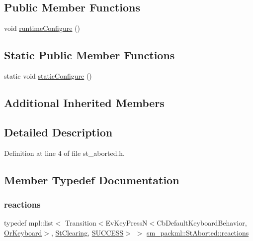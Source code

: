\subsection*{Public Member Functions}
\begin{DoxyCompactItemize}
\item 
void \hyperlink{structsm__packml_1_1StAborted_ae24353777c69ff47bf657ba4314fb0c3}{runtime\+Configure} ()
\end{DoxyCompactItemize}
\subsection*{Static Public Member Functions}
\begin{DoxyCompactItemize}
\item 
static void \hyperlink{structsm__packml_1_1StAborted_a73f83ae5cecaba62aa744b947d2598b3}{static\+Configure} ()
\end{DoxyCompactItemize}
\subsection*{Additional Inherited Members}


\subsection{Detailed Description}


Definition at line 4 of file st\+\_\+aborted.\+h.



\subsection{Member Typedef Documentation}
\mbox{\label{structsm__packml_1_1StAborted_a0ada6056ec0c5c45cd03c1c4bf720501}} 
\subsubsection{\texorpdfstring{reactions}{reactions}}
{\footnotesize\ttfamily typedef mpl\+::list$<$ Transition$<$Ev\+Key\+PressN$<$Cb\+Default\+Keyboard\+Behavior, \hyperlink{classsm__packml_1_1OrKeyboard}{Or\+Keyboard}$>$, \hyperlink{structsm__packml_1_1StClearing}{St\+Clearing}, \hyperlink{classSUCCESS}{S\+U\+C\+C\+E\+SS}$>$ $>$ \hyperlink{structsm__packml_1_1StAborted_a0ada6056ec0c5c45cd03c1c4bf720501}{sm\+\_\+packml\+::\+St\+Aborted\+::reactions}}



